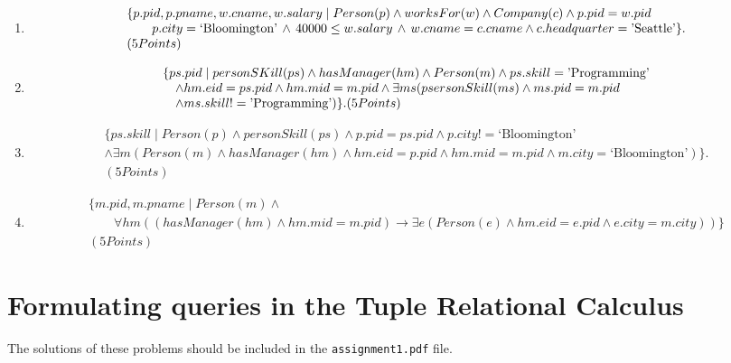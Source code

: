 \documentclass{article}
\begin{document}
\begin{enumerate}[resume]
\item 
{\small
\[
\begin{array}{ll}
\{p.pid, p.pname, w.cname, w.salary\mid Person(p) \land worksFor(w)\land Company(c)\land p.pid = w.pid\\
\qquad p.city = \mbox{\rm `Bloomington'}\, \land\, 40000 \leq w.salary\, \land\, w.cname = c.cname\land c.headquarter = \mbox{\rm 'Seattle'}\}.\\ (5 Points)
\end{array}
\]
}


\item 
{\small
\[
\begin{array}{ll}
\{ps.pid \mid personSKill(ps) \land hasManager(hm) \land Person(m) \land ps.skill = \mbox{\rm 'Programming'} \\ \quad  \land hm.eid = ps.pid \land hm.mid = m.pid \land \exists ms (psersonSkill(ms) \land ms.pid = m.pid \\ \quad \land ms.skill != \mbox{\rm 'Programming'})\}. (5 Points)
\end{array}
\]
}

\item 
{\small
\[
\begin{array}{ll}
\{ps.skill\mid Person(p) \land personSkill(ps)\land  p.pid = ps.pid \land p.city != \mbox{`Bloomington'} \\
\land \exists m (Person(m) \land hasManager(hm) \land hm.eid = p.pid \land hm.mid = m.pid \land m.city = \mbox{`Bloomington'} ) \}.\\ (5 Points)
\end{array}
\]
}


\item 
{\small
\[
\begin{array}{ll}
\{m.pid, m.pname\mid Person(m) \land \\
\qquad \forall hm ((hasManager(hm)\land hm.mid = m.pid)\rightarrow 
\exists e (Person(e)\land hm.eid = e.pid \land e.city = m.city))\}\\(5 Points)
\end{array}
\]
}

\end{enumerate}
\newpage
\section{Formulating queries in the Tuple Relational Calculus}


The solutions of these problems should be included in the {\tt assignment1.pdf} file.
\end{document}
